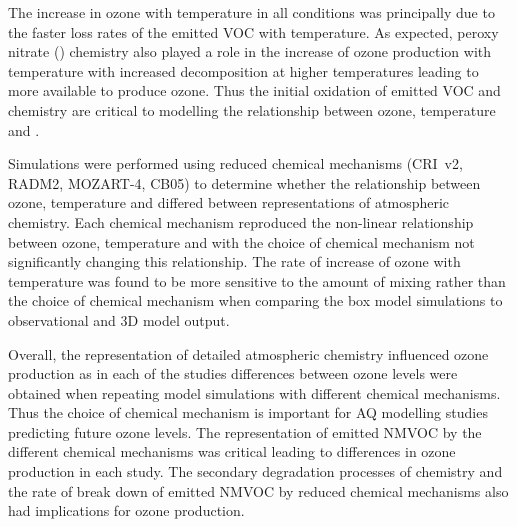 The increase in ozone with temperature in all  conditions was principally due to the faster loss rates of the emitted VOC with temperature.
As expected, peroxy nitrate () chemistry also played a role in the increase of ozone production with temperature with increased  decomposition at higher temperatures leading to more  available to produce ozone.
Thus the initial oxidation of emitted VOC and  chemistry are critical to modelling the relationship between ozone, temperature and .

Simulations were performed using reduced chemical mechanisms (CRI~v2, RADM2, MOZART-4, CB05) to determine whether the relationship between ozone, temperature and  differed between representations of atmospheric chemistry.
Each chemical mechanism reproduced the non-linear relationship between ozone, temperature and  with the choice of chemical mechanism not significantly changing this relationship.
The rate of increase of ozone with temperature was found to be more sensitive to the amount of mixing rather than the choice of chemical mechanism when comparing the box model simulations to observational and 3D model output.

Overall, the representation of detailed atmospheric chemistry influenced ozone production as in each of the studies differences between ozone levels were obtained when repeating model simulations with different chemical mechanisms.
Thus the choice of chemical mechanism is important for AQ modelling studies predicting future ozone levels.
The representation of emitted NMVOC by the different chemical mechanisms was critical leading to differences in ozone production in each study.
The secondary degradation processes of  chemistry and the rate of break down of emitted NMVOC by reduced chemical mechanisms also had implications for ozone production.
